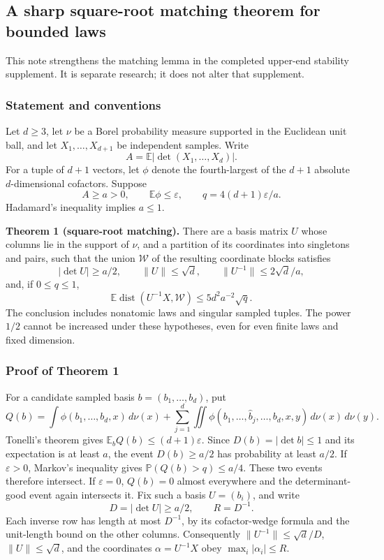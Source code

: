 \documentclass[
  11pt,
]{article}
\begin{document}
\subsection{A sharp square-root matching theorem for bounded
laws}\label{a-sharp-square-root-matching-theorem-for-bounded-laws}

This note strengthens the matching lemma in the completed upper-end
stability supplement. It is separate research; it does not alter that
supplement.

\subsubsection{Statement and
conventions}\label{statement-and-conventions}

Let \(d\ge3\), let \(\nu\) be a Borel probability measure supported in
the Euclidean unit ball, and let \(X_1,\ldots,X_{d+1}\) be independent
samples. Write \[
 A=\mathbb E|\det(X_1,\ldots,X_d)|.
\] For a tuple of \(d+1\) vectors, let \(\phi\) denote the
fourth-largest of the \(d+1\) absolute \(d\)-dimensional cofactors.
Suppose \[
 A\ge a>0,\qquad \mathbb E\phi\le\varepsilon,
 \qquad q=4(d+1)\varepsilon/a.
\] Hadamard's inequality implies \(a\le1\).

\textbf{Theorem 1 (square-root matching).} There are a basis matrix
\(U\) whose columns lie in the support of \(\nu\), and a partition of
its coordinates into singletons and pairs, such that the union
\(\mathcal W\) of the resulting coordinate blocks satisfies \[
 |\det U|\ge a/2,\qquad \|U\|\le\sqrt d,
 \qquad \|U^{-1}\|\le2\sqrt d/a,
\] and, if \(0\le q\le1\), \[
 \mathbb E\operatorname{dist}(U^{-1}X,\mathcal W)
 \le5d^2a^{-2}\sqrt q.                                      \tag{1}
\] The conclusion includes nonatomic laws and singular sampled tuples.
The power \(1/2\) cannot be increased under these hypotheses, even for
even finite laws and fixed dimension.

\subsubsection{Proof of Theorem 1}\label{proof-of-theorem-1}

For a candidate sampled basis \(b=(b_1,\ldots,b_d)\), put \[
 Q(b)=\int\phi(b_1,\ldots,b_d,x)\,d\nu(x)
 +\sum_{j=1}^d\iint
 \phi(b_1,\ldots,\widehat b_j,\ldots,b_d,x,y)
 \,d\nu(x)\,d\nu(y).
\] Tonelli's theorem gives \(\mathbb E_bQ(b)\le(d+1)\varepsilon\). Since
\(D(b)=|\det b|\le1\) and its expectation is at least \(a\), the event
\(D(b)\ge a/2\) has probability at least \(a/2\). If \(\varepsilon>0\),
Markov's inequality gives \(\mathbb P(Q(b)>q)\le a/4\). These two events
therefore intersect. If \(\varepsilon=0\), \(Q(b)=0\) almost everywhere
and the determinant-good event again intersects it. Fix such a basis
\(U=(b_i)\), and write \[
 D=|\det U|\ge a/2,\qquad R=D^{-1}.
\] Each inverse row has length at most \(D^{-1}\), by its cofactor-wedge
formula and the unit-length bound on the other columns. Consequently
\(\|U^{-1}\|\le\sqrt d/D\), \(\|U\|\le\sqrt d\), and the coordinates
\(\alpha=U^{-1}X\) obey \(\max_i|\alpha_i|\le R\).
\end{document}
